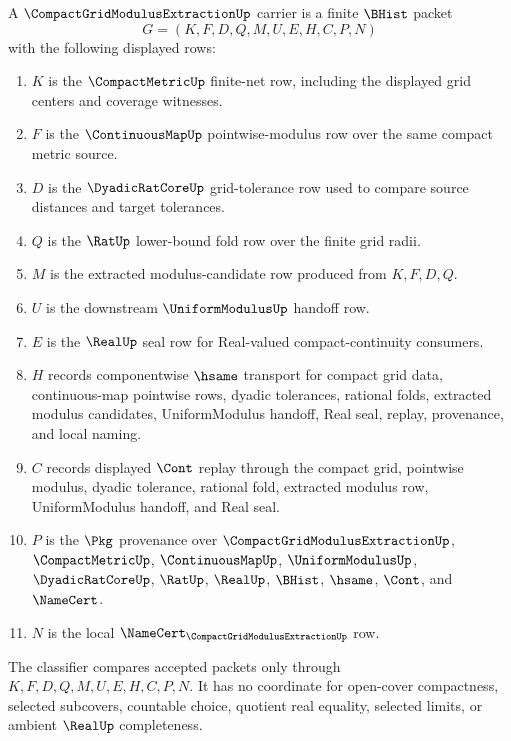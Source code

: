 \begin{definition}
\label{def:compact-grid-modulus-extraction-carrier}
A $\CompactGridModulusExtractionUp$ carrier is a finite $\BHist$ packet
$$
G=(K,F,D,Q,M,U,E,H,C,P,N)
$$
with the following displayed rows:
\begin{enumerate}
\item $K$ is the $\CompactMetricUp$ finite-net row, including the displayed grid centers and coverage witnesses.
\item $F$ is the $\ContinuousMapUp$ pointwise-modulus row over the same compact metric source.
\item $D$ is the $\DyadicRatCoreUp$ grid-tolerance row used to compare source distances and target tolerances.
\item $Q$ is the $\RatUp$ lower-bound fold row over the finite grid radii.
\item $M$ is the extracted modulus-candidate row produced from $K,F,D,Q$.
\item $U$ is the downstream $\UniformModulusUp$ handoff row.
\item $E$ is the $\RealUp$ seal row for Real-valued compact-continuity consumers.
\item $H$ records componentwise $\hsame$ transport for compact grid data, continuous-map pointwise rows, dyadic tolerances, rational folds, extracted modulus candidates, UniformModulus handoff, Real seal, replay, provenance, and local naming.
\item $C$ records displayed $\Cont$ replay through the compact grid, pointwise modulus, dyadic tolerance, rational fold, extracted modulus row, UniformModulus handoff, and Real seal.
\item $P$ is the $\Pkg$ provenance over $\CompactGridModulusExtractionUp$, $\CompactMetricUp$, $\ContinuousMapUp$, $\UniformModulusUp$, $\DyadicRatCoreUp$, $\RatUp$, $\RealUp$, $\BHist$, $\hsame$, $\Cont$, and $\NameCert$.
\item $N$ is the local $\NameCert_{\CompactGridModulusExtractionUp}$ row.
\end{enumerate}
The classifier compares accepted packets only through $K,F,D,Q,M,U,E,H,C,P,N$. It has no coordinate for open-cover compactness, selected subcovers, countable choice, quotient real equality, selected limits, or ambient $\RealUp$ completeness.
\end{definition}

